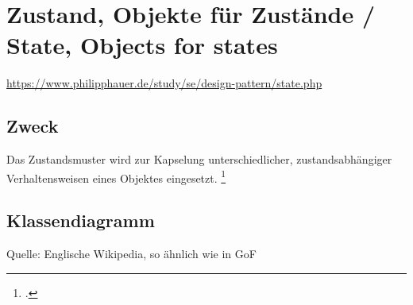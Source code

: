 \documentclass{lehramt-informatik}
\begin{document}

\chapter{Zustand, Objekte für Zustände / State, Objects for states}

\begin{quellen}
\item \cite{wiki:zustand}
\item \url{https://www.philipphauer.de/study/se/design-pattern/state.php}
\item \cite[PDF Seite 258-265]{gof}
\item \cite[Seite 69-81]{siebler}
\end{quellen}

\section{Zweck}

Das Zustandsmuster wird zur Kapselung unterschiedlicher,
zustandsabhängiger Verhaltensweisen eines Objektes eingesetzt.
\footcite{wiki:zustand}

%

\section{Klassendiagramm}


Quelle: Englische Wikipedia, so ähnlich wie in GoF
\end{document}
